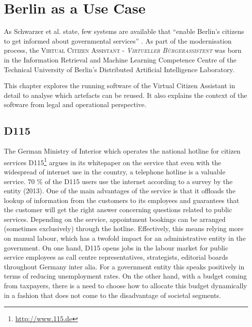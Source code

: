 \chapter{Berlin as a Use Case}
\label{blnusecase}
As Schwarzer et al. state, few systems are available that ``enable Berlin’s citizens to get informed about governmental services'' \cite{lomm:gov}.
As part of the modernisation process, the \textsc{Virtual Citizen Assistant - \emph{Virtueller Bürgerassistent}} was born in %
the Information Retrieval and Machine Learning Competence Centre of the Technical University of Berlin's Distributed Artificial Intelligence Laboratory.

This chapter explores the running software of the Virtual Citizen Assistant in detail to analyse which artefacts can be reused. It also explains the context of the software from legal and operational perspective.

\section{D115}
\label{d115}
The German Ministry of Interior which operates the national hotline for citizen services D115\footnote{\url{http://www.115.de}} argues in its whitepaper on the service\cite{d115} that even with the widespread of internet use in the country, a telephone hotline is a valuable service. 70 \% of the D115 users use the internet according to a survey by the entity (2013). One of the main advantages of the service is that it offloads the lookup of information from the customers to its employees and guarantees that the customer will get the right answer concerning questions related to public services. Depending on the service, appointment bookings can be arranged (sometimes exclusively) through the hotline. Effectively, this means relying more on manual labour, which has a twofold impact for an administrative entity in the government. On one hand, D115 opens jobs in the labour market for public service employees as call centre representatives, strategists, editorial boards throughout Germany inter alia. For a government entity this speaks positively in terms of reducing unemployment rates. On the other hand, with a budget coming from taxpayers, there is a need to choose how to allocate this budget dynamically in a fashion that does not come to the disadvantage of societal segments.

